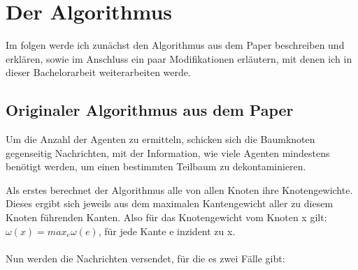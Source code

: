 \section{Der Algorithmus}
Im folgen werde ich zunächst den Algorithmus aus dem Paper beschreiben und erklären, sowie im Anschluss ein paar Modifikationen erläutern, mit denen ich in dieser Bachelorarbeit weiterarbeiten werde.



\subsection{Originaler Algorithmus aus dem Paper}\label{paperAlgoChapter}
Um die Anzahl der Agenten zu ermitteln, schicken sich die Baumknoten gegenseitig Nachrichten, mit der Information, wie viele Agenten mindestens benötigt werden, um einen bestimmten Teilbaum zu dekontaminieren.


Als erstes berechnet der Algorithmus alle von allen Knoten ihre Knotengewichte. Dieses ergibt sich jeweils aus dem maximalen Kantengewicht aller zu diesem Knoten führenden Kanten. Also für das Knotengewicht vom Knoten x gilt: $\omega(x) = max_{e} \omega(e)$, für jede Kante e inzident zu x.
\\
\\
Nun werden die Nachrichten versendet, für die es zwei Fälle gibt:

